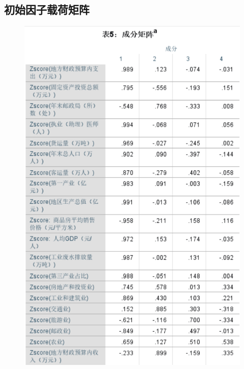 \documentclass{whutmod}
\begin{document}
\subsection{初始因子载荷矩阵}
	\begin{figure}[H]
	\centering
	\includegraphics[width=\textwidth]{figures/1.png}

\end{figure}  
\end{document}
